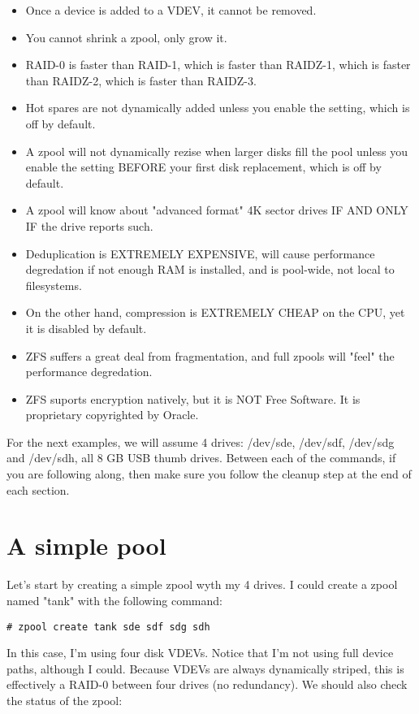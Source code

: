 \documentclass[landscape]{book}
\begin{document}
\begin{itemize}
\item Once a device is added to a VDEV, it cannot be removed.
\item You cannot shrink a zpool, only grow it.
\item RAID-0 is faster than RAID-1, which is faster than RAIDZ-1, which is
faster than RAIDZ-2, which is faster than RAIDZ-3.
\item Hot spares are not dynamically added unless you enable the setting,
which is off by default.
\item A zpool will not dynamically rezise when larger disks fill the pool
unless you enable the setting BEFORE your first disk replacement, which is
off by default.
\item A zpool will know about "advanced format" 4K sector drives IF AND
ONLY IF the drive reports such.
\item Deduplication is EXTREMELY EXPENSIVE, will cause performance
degredation if not enough RAM is installed, and is pool-wide, not local to
filesystems.
\item On the other hand, compression is EXTREMELY CHEAP on the CPU, yet it
is disabled by default.
\item ZFS suffers a great deal from fragmentation, and full zpools will
"feel" the performance degredation.
\item ZFS suports encryption natively, but it is NOT Free Software. It is
proprietary copyrighted by Oracle.
\end{itemize}

For the next examples, we will assume 4 drives: /dev/sde, /dev/sdf,
/dev/sdg and /dev/sdh, all 8 GB USB thumb drives. Between each of the
commands, if you are following along, then make sure you follow the cleanup
step at the end of each section.

\section{A simple pool}
Let's start by creating a simple zpool wyth my 4 drives. I could create a
zpool named "tank" with the following command:

\begin{lstlisting}
# zpool create tank sde sdf sdg sdh
\end{lstlisting}

In this case, I'm using four disk VDEVs. Notice that I'm not using full
device paths, although I could. Because VDEVs are always dynamically
striped, this is effectively a RAID-0 between four drives (no redundancy).
We should also check the status of the zpool:
\end{document}
